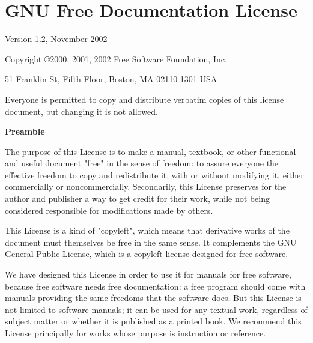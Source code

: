 \documentclass[oneside]{stacks-project-book}
\theoremstyle{plain}
\theoremstyle{definition}
\theoremstyle{remark}
\numberwithin{equation}{subsection}
\begin{document}
%

\chapter{GNU Free Documentation License}

\label{fdl-section-phantom}
\hypertarget{02C1}{}
\reversemarginpar{}

\begin{center}

      Version 1.2, November 2002


Copyright \copyright 2000, 2001, 2002  Free Software Foundation, Inc.

\bigskip

    51 Franklin St, Fifth Floor, Boston, MA  02110-1301  USA

\bigskip

Everyone is permitted to copy and distribute verbatim copies
of this license document, but changing it is not allowed.
\end{center}


\begin{center}
{\bf\large Preamble}
\end{center}

The purpose of this License is to make a manual, textbook, or other
functional and useful document "free" in the sense of freedom: to
assure everyone the effective freedom to copy and redistribute it,
with or without modifying it, either commercially or noncommercially.
Secondarily, this License preserves for the author and publisher a way
to get credit for their work, while not being considered responsible
for modifications made by others.

This License is a kind of "copyleft", which means that derivative
works of the document must themselves be free in the same sense.  It
complements the GNU General Public License, which is a copyleft
license designed for free software.

We have designed this License in order to use it for manuals for free
software, because free software needs free documentation: a free
program should come with manuals providing the same freedoms that the
software does.  But this License is not limited to software manuals;
it can be used for any textual work, regardless of subject matter or
whether it is published as a printed book.  We recommend this License
principally for works whose purpose is instruction or reference.
\end{document}
